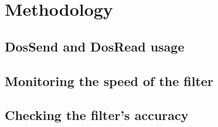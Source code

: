 \chapter{Methodology}

\section{DosSend and DosRead usage}

\section{Monitoring the speed of the filter}

\section{Checking the filter's accuracy}